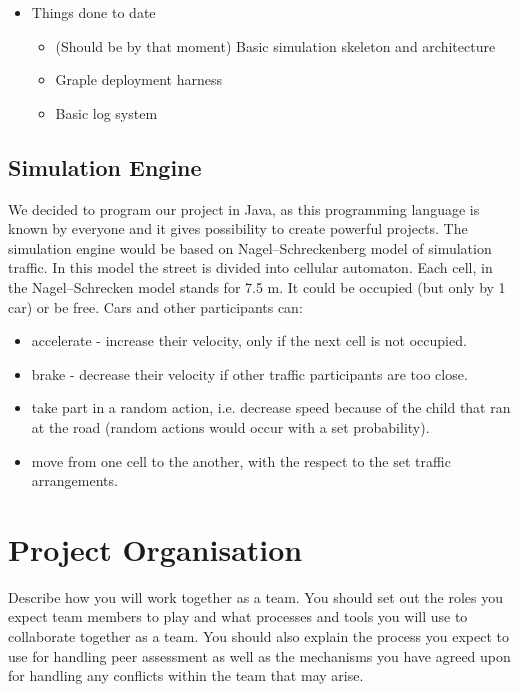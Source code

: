\begin{itemize}
\begin{itemize}
	\end{itemize}

	\item Things done to date
	\begin{itemize}
		\item (Should be by that moment) Basic simulation skeleton and architecture
		\item Graple deployment harness
		\item Basic log system
	\end{itemize}

\end{itemize}

\subsection{Simulation Engine} 

We decided to program our project in Java, as this programming language is known by everyone and it gives possibility to create powerful projects. The simulation engine would be based on Nagel–Schreckenberg model of simulation traffic. In this model the street is divided into cellular automaton. Each cell, in the Nagel–Schrecken model stands for 7.5 m. It could be occupied (but only by 1 car) or be free. Cars and other participants can:
	\begin{itemize}
		\item accelerate - increase their velocity, only if the next cell is not occupied.
		\item brake - decrease their  velocity if other traffic participants are too close. 
		\item take part in a random action, i.e. decrease speed because of the child that ran at the road (random actions would occur with a set probability). 
		\item move from one cell to the another, with the respect to the set traffic arrangements. 
	\end{itemize}
	
	

\section{Project Organisation} %
Describe how you will work together as a team. You should set out the roles you expect team members to play and what
processes and tools you will use to collaborate together as a team. You should also explain the process you expect to
use for handling peer assessment as well as the mechanisms you have agreed upon for handling any conflicts within the
team that may arise.

